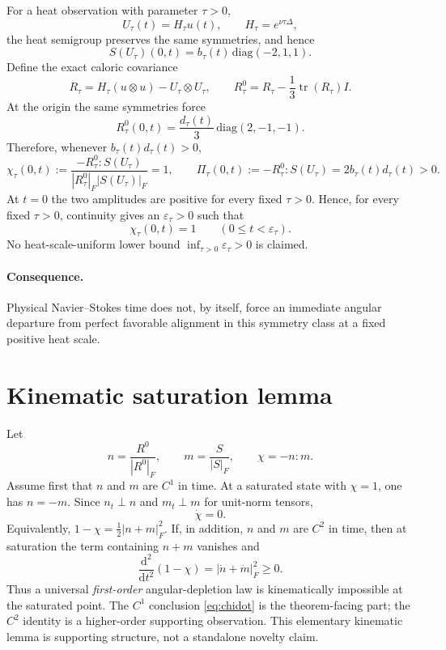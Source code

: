 \documentclass[11pt,a4paper]{article}
\newcommand{\tr}{\operatorname{tr}}
\newcommand{\dd}{\mathrm{d}}
\begin{document}
For a heat observation with parameter $\tau>0$,
\begin{equation}
 U_\tau(t)=H_\tau u(t),\qquad H_\tau=e^{\nu\tau\Delta},
\end{equation}
the heat semigroup preserves the same symmetries, and hence
\begin{equation}
 S(U_\tau)(0,t)=b_\tau(t)\,\mathrm{diag}(-2,1,1).
 \label{eq:Sshape}
\end{equation}
Define the exact caloric covariance
\begin{equation}
 R_\tau=H_\tau(u\otimes u)-U_\tau\otimes U_\tau,
 \qquad R_\tau^0=R_\tau-\frac13\tr(R_\tau)I.
\end{equation}
At the origin the same symmetries force
\begin{equation}
 R_\tau^0(0,t)=\frac{d_\tau(t)}3\,\mathrm{diag}(2,-1,-1).
 \label{eq:Rshape}
\end{equation}
Therefore, whenever $b_\tau(t)d_\tau(t)>0$,
\begin{equation}
 \chi_\tau(0,t):=\frac{-R_\tau^0:S(U_\tau)}{|R_\tau^0|_F|S(U_\tau)|_F}=1,
 \qquad \Pi_\tau(0,t):=-R_\tau^0:S(U_\tau)=2b_\tau(t)d_\tau(t)>0.
 \label{eq:chiPi}
\end{equation}
At $t=0$ the two amplitudes are positive for every fixed $\tau>0$. Hence, for every fixed $\tau>0$, continuity gives an $\varepsilon_\tau>0$ such that
\begin{equation}
 \chi_\tau(0,t)=1\qquad (0\le t<\varepsilon_\tau).
 \label{eq:quantifier}
\end{equation}
No heat-scale-uniform lower bound $\inf_{\tau>0}\varepsilon_\tau>0$ is claimed.

\paragraph{Consequence.}
Physical Navier--Stokes time does not, by itself, force an immediate angular departure from perfect favorable alignment in this symmetry class at a fixed positive heat scale.

\section{Kinematic saturation lemma}
Let
\[
 n=\frac{R^0}{|R^0|_F},\qquad m=\frac{S}{|S|_F},\qquad \chi=-n:m.
\]
Assume first that $n$ and $m$ are $C^1$ in time. At a saturated state with $\chi=1$, one has $n=-m$. Since $n_t\perp n$ and $m_t\perp m$ for unit-norm tensors,
\begin{equation}
 \dot\chi=0.
 \label{eq:chidot}
\end{equation}
Equivalently, $1-\chi=\tfrac12|n+m|_F^2$. If, in addition, $n$ and $m$ are $C^2$ in time, then at saturation the term containing $n+m$ vanishes and
\begin{equation}
 \frac{\dd^2}{\dd t^2}(1-\chi)=|\dot n+\dot m|_F^2\ge0.
\end{equation}
Thus a universal \emph{first-order} angular-depletion law is kinematically impossible at the saturated point. The $C^1$ conclusion \eqref{eq:chidot} is the theorem-facing part; the $C^2$ identity is a higher-order supporting observation. This elementary kinematic lemma is supporting structure, not a standalone novelty claim.
\end{document}
